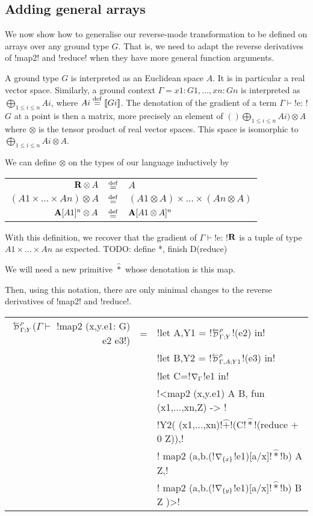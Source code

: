 \subsection{Adding general arrays} %
\label{sub:Adding general arrays}

We now show how to generalise our reverse-mode transformation to be defined on arrays over any ground type $G$.
That is, we need to adapt the reverse derivatives of !map2! and !reduce! when they have more general function arguments.

A ground type $G$ is interpreted as an Euclidean space $A$. 
It is in particular a real vector space.
Similarly, a ground context $\Gamma=x1:G1,...,xn:Gn$ is interpreted as $\bigoplus_{1\leq i\leq n}Ai$, where $Ai\stackrel {\mathrm{def}}=\llbracket Gi\rrbracket$.
The denotation of the gradient of a term $\Gamma \vdash$!e: !$G$ at a point is then a matrix, more precisely an element of $()\bigoplus_{1\leq i\leq n}Ai)\otimes A$
where $\otimes$ is the tensor product of real vector spaces. This space is isomorphic to $\bigoplus_{1\leq i\leq n}Ai\otimes A$.

We can define $\otimes$ on the types of our language inductively by

\begin{tabular}{r c l}
    $\mathbf{R} \otimes A$ & $\stackrel {\mathrm{def}}=$ & $A$ \\
    $(A1 \times ... \times An)\otimes A$ & $\stackrel {\mathrm{def}}=$ & $(A1\otimes A) \times ... \times (An \otimes A)$ \\
    $\mathbf{A}[A1]^{n} \otimes A$ & $\stackrel {\mathrm{def}}=$ & $\mathbf{A}[A1\otimes A]^{n}$
\end{tabular}

With this definition, we recover that the gradient of $\Gamma \vdash$!e: !$\mathbf{R}$ is a tuple of type $A1\times...\times An$ as expected.
TODO: define *, finish D(reduce)

We will need a new primitive $\widehat{*}$ whose denotation is this map.

Then, using this notation, there are only minimal changes to the reverse derivatives of !map2! and !reduce!.

\begin{center}
\begin{tabular}{r c l}
    $\directD{\rho}{\Gamma}{Y}$($\Gamma\vdash $ !map2 (x,y.e1: G) e2 e3!) &=&  
    !let A,Y1 = !$\directD{\rho}{\Gamma}{Y}$!(e2) in! \\
    && !let B,Y2 = !$\directD{\rho}{\Gamma,A}{Y1}$!(e3) in! \\
    && !let C=!$\nabla_{\Gamma}$!e1 in!\\
    && !<map2 (x,y.e1) A B, fun (x1,...,xn,Z) -> !\\
    && !Y2( (x1,...,xn)!$\widehat{+}$!(C!$\widehat{*}$!(reduce + 0 Z)),!\\
    && \quad\quad! map2 (a,b.(!$\nabla_{\{x\}}$!e1)[a/x]!$\widehat{*}$!b) A Z,!\\
    && \quad\quad! map2 (a,b.(!$\nabla_{\{y\}}$!e1)[a/x]!$\widehat{*}$!b) B Z )>!\\
    \end{tabular}
    \end{center}

